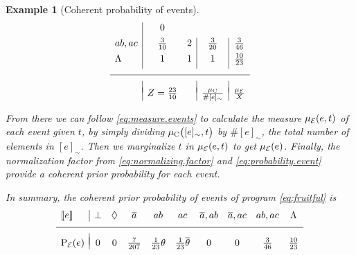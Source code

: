 \documentclass[a4paper]{article}
\newtheorem{example}{Example}
\newtheorem{example}{Example}
\newcommand{\at}[1]{\ensuremath{\!\del{#1}}}        %
\newcommand{\cla}[1]{\ensuremath{{\cal #1}}}        %
\newcommand{\co}[1]{\ensuremath{\overline{#1}}}     %
\newcommand{\EVENTSset}{\ensuremath{\cla{E}}}
\newcommand{\prfunc}{\ensuremath{\mathrm{P}}}
\newcommand{\prd}[1]{\ensuremath{\prfunc_{#1}}}
\newcommand{\prE}{\prd{\EVENTSset}}
\newcommand{\pwC}{\ensuremath{\mu_{\textrm{C}}}}
\newcommand{\pwc}[1]{\ensuremath{\pwC\at{#1}}}
\newcommand{\pwE}{\ensuremath{\mu_{\EVENTSset}}}
\newcommand{\pwe}[1]{\ensuremath{\pwE\at{#1}}}
\newcommand{\stablecore}[1]{\ensuremath{\left\llbracket #1 \right\rrbracket}}
\newcommand{\inconsistent}{\bot}
\newcommand{\bottomclass}{\ensuremath{\Lambda}}
\newcommand{\indepclass}{\ensuremath{\Diamond}}
\newcommand{\class}[1]{\ensuremath{[{#1}]_{\sim}}}
\begin{document}
{\begin{example}[Coherent probability of events]
\begin{equation*}
\begin{array}{l|cc|c|c}
                & 0
            \\[4pt]
            ab, ac
                & \frac{3}{10}
                & 2
                & \frac{3}{20}
                & \frac{3}{46}
            \\[4pt]
            \bottomclass
                & 1
                & 1
                & 1
                & \frac{10}{23}
            \\[4pt]
            \hline
            &&&&
            \\[-0.5em]
                & Z = \frac{23}{10}
                &
                & \frac{\pwC}{\#\class{e}}
                & \frac{\pwE}{X}
        \end{array}
    \end{equation*}

    
    From there we can follow \cref{eq:measure.events} to calculate the
    measure \(\pwe{e, t}\) of each event given \(t\), by simply
    dividing \(\pwc{\class{e}, t}\) by \(\#\class{e}\), the total
    number of elements in \(\class{e}\).  Then we marginalize \(t\) in
    \(\pwe{e, t}\) to get \(\pwe{e}\).  Finally, the normalization
    factor from \cref{eq:normalizing.factor} and
    \cref{eq:probability.event} provide a coherent \emph{prior}
    probability for each event.

    In summary, the coherent \emph{prior} probability of events of
    program \cref{eq:fruitful} is
    \begin{equation}
        \begin{array}{l|ccccccccc}
            \stablecore{e}          &
            \inconsistent           &
            \indepclass             &
            \co{a}                  &
            ab                      &
            ac                      &
            \co{a}, ab              &
            \co{a}, ac              &
            ab, ac                  &
            \bottomclass              \\ 
            
            \hline\\[-8pt]

            \prE\at{e}              &
            0                       &
            0                       &
            \frac{7}{207}           &
            \frac{1}{23}\theta      &
            \frac{1}{23}\co{\theta} &
            0                       &
            0                       &
            \frac{3}{46}            &
            \frac{10}{23}
        \end{array}
    \end{equation}\label{eq:sbf.prior}
\end{example}
}
\end{document}
